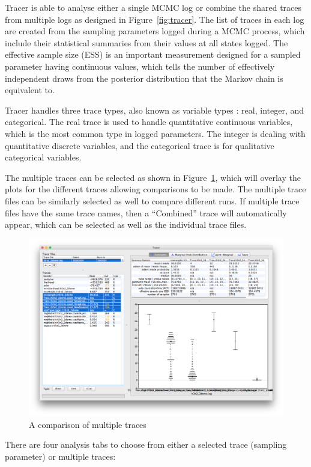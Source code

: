 \documentclass{bioinfo}
\begin{document}
Tracer is able to analyse either a single MCMC log or combine the shared traces from multiple logs as designed in Figure~\ref{fig:tracer}. 
The list of traces in each log are created from the sampling parameters logged during a MCMC process, which include their statistical summaries from their values at all states logged. 
The effective sample size (ESS) is an important measurement designed for a sampled parameter having continuous values, which tells the number of effectively independent draws from the posterior distribution that the Markov chain is equivalent to.

Tracer handles three trace types, also known as variable types \citep{mendenhall2012introduction}: real, integer, and categorical.
The real trace is used to handle quantitative continuous variables, which is the most common type in logged parameters.
The integer is dealing with quantitative discrete variables, and the categorical trace is for qualitative categorical variables. 

The multiple traces can be selected as shown in Figure~\ref{fig:multitrace}, which will overlay the plots for the different traces allowing comparisons to be made. The multiple trace files can be similarly selected as well to compare different runs. If multiple trace files have the same trace names,  then a ``Combined'' trace will automatically appear, which can be selected as well as the individual trace files.

\begin{figure}[ht]
\includegraphics[width=.5\textwidth]{./figures/multitrace.png}  
\caption{A comparison of multiple traces}
\label{fig:multitrace}
\end{figure}

There are four analysis tabs to choose from either a selected trace (sampling parameter) or multiple traces:
\end{document}
